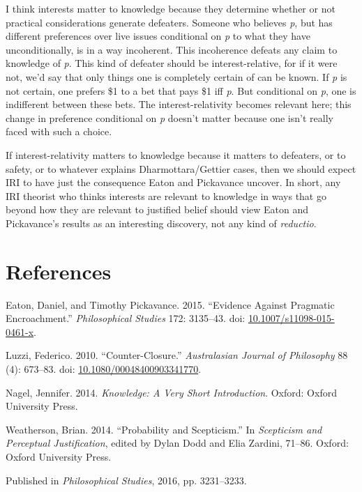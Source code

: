 \documentclass[
  10pt,
  letterpaper,
  DIV=11,
  numbers=noendperiod,
  twoside]{scrartcl}
\newlength{\cslhangindent}
\newenvironment{CSLReferences}[2] %
 {\begin{list}{}{%
  \setlength{\itemindent}{0pt}
  \setlength{\leftmargin}{0pt}
  \setlength{\parsep}{0pt}
  \ifodd #1
   \setlength{\leftmargin}{\cslhangindent}
   \setlength{\itemindent}{-1\cslhangindent}
  \fi
  \setlength{\itemsep}{#2\baselineskip}}}
 {\end{list}}
\begin{document}
I think interests matter to knowledge because they determine whether or
not practical considerations generate defeaters. Someone who believes
\emph{p}, but has different preferences over live issues conditional on
\emph{p} to what they have unconditionally, is in a way incoherent. This
incoherence defeats any claim to knowledge of \emph{p}. This kind of
defeater should be interest-relative, for if it were not, we'd say that
only things one is completely certain of can be known. If \emph{p} is
not certain, one prefers \$1 to a bet that pays \$1 iff \emph{p}. But
conditional on \emph{p}, one is indifferent between these bets. The
interest-relativity becomes relevant here; this change in preference
conditional on \emph{p} doesn't matter because one isn't really faced
with such a choice.

If interest-relativity matters to knowledge because it matters to
defeaters, or to safety, or to whatever explains Dharmottara/Gettier
cases, then we should expect IRI to have just the consequence Eaton and
Pickavance uncover. In short, any IRI theorist who thinks interests are
relevant to knowledge in ways that go beyond how they are relevant to
justified belief should view Eaton and Pickavance's results as an
interesting discovery, not any kind of \emph{reductio}.

\section*{References}\label{references}

\label{refs}
\begin{CSLReferences}{1}{0}
Eaton, Daniel, and Timothy Pickavance. 2015. {``Evidence Against
Pragmatic Encroachment.''} \emph{Philosophical Studies} 172: 3135--43.
doi:
\href{https://doi.org/10.1007/s11098-015-0461-x}{10.1007/s11098-015-0461-x}.

Luzzi, Federico. 2010. {``Counter-Closure.''} \emph{Australasian Journal
of Philosophy} 88 (4): 673--83. doi:
\href{https://doi.org/10.1080/00048400903341770}{10.1080/00048400903341770}.

Nagel, Jennifer. 2014. \emph{Knowledge: A Very Short Introduction}.
Oxford: Oxford University Press.

Weatherson, Brian. 2014. {``Probability and Scepticism.''} In
\emph{Scepticism and Perceptual Justification}, edited by Dylan Dodd and
Elia Zardini, 71--86. Oxford: Oxford University Press.

\end{CSLReferences}



\noindent Published in\emph{
Philosophical Studies}, 2016, pp. 3231–3233.
\end{document}
